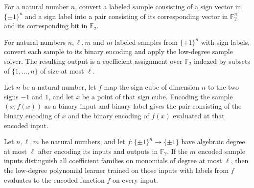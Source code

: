 \begin{definition}
\label{FABL.binaryLabeledSample}
\leanok
{}
For a natural number $n$, convert a labeled sample consisting of a sign vector in
$\{\pm1\}^n$ and a sign label into a pair consisting of its corresponding vector in
$\mathbb{F}_2^n$ and its corresponding bit in $\mathbb{F}_2$.
\end{definition}

\begin{definition}
\leanok
{}
For natural numbers $n,\ell,m$ and $m$ labeled samples from $\{\pm1\}^n$ with sign
labels, convert each sample to its binary encoding and apply the low-degree sample
solver. The resulting output is a coefficient assignment over $\mathbb{F}_2$ indexed by
subsets of $\{1,\ldots,n\}$ of size at most $\ell$.
\end{definition}

\begin{theorem}
\label{FABL.binaryLabeledSample_target}
\leanok
{}
Let $n$ be a natural number, let $f$ map the sign cube of dimension $n$ to the two signs
$-1$ and $1$, and let $x$ be a point of that sign cube. Encoding the sample $(x,f(x))$
as a binary input and binary label gives the pair consisting of the binary encoding of
$x$ and the binary encoding of $f(x)$ evaluated at that encoded input.
\end{theorem}

\begin{theorem}
\leanok
{}
Let $n,\ell,m$ be natural numbers, and let $f:\{\pm1\}^n\to\{\pm1\}$ have algebraic
degree at most $\ell$ after encoding its inputs and outputs in $\mathbb F_2$. If the $m$
encoded sample inputs distinguish all coefficient families on monomials of degree at
most $\ell$, then the low-degree polynomial learner trained on those inputs with labels
from $f$ evaluates to the encoded function $f$ on every input.
\end{theorem}

